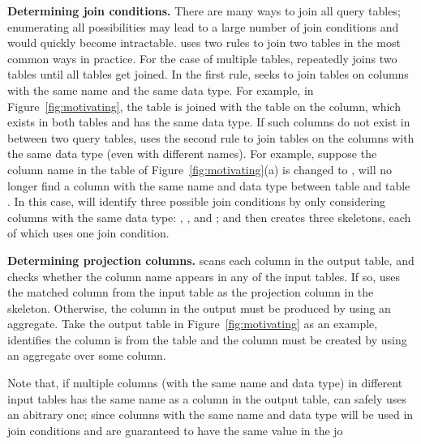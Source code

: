 \vspace{1mm}
{\textbf{Determining join conditions. }} There
are many ways to join all query tables; enumerating
all possibilities may lead to a large number of
join conditions and would quickly
become intractable. \ourtool uses
two rules to join two tables in 
the most common ways in practice. For the case of
multiple tables, \ourtool repeatedly joins
two tables until all tables get joined.
In the first rule, \ourtool seeks to join
tables on columns with the
same name and the same data type. For example,
in Figure~\ref{fig:motivating}, the  table
is joined with the  table on the
 column, which exists in both
tables and has the same data type.
If such columns do not exist in between two
query tables, \ourtool uses the second rule to
join tables on the columns with the same data type
(even with different names).
For example, suppose the column name 
in the  table of Figure~\ref{fig:motivating}(a)
is changed to , \ourtool will no longer
find a column with the same name and data type between
table  and table . In this case,
\ourtool will identify three possible join conditions
by only considering columns with the same data type:
, ,
and ; and then creates 
three skeletons, each of which uses one join condition. 

{\textbf{Determining projection columns.}} \ourtool
scans each column in the output table, and checks whether
the column name appears in any of the input tables.
If so, \ourtool uses the matched column from the input
table as the projection column in the skeleton.
Otherwise, the column in the output must be produced by using an aggregate.
Take the output table in Figure~\ref{fig:motivating} as an
example, \ourtool identifies the  column
is from the  table and
the  column must be created by using
an aggregate over some column.


Note that, if multiple columns (with the same name and data type)
in different input tables has the same name as a column in the output table, \ourtool
can safely uses an abitrary one; since columns with the
same name and data type will be used in join conditions and
are guaranteed to have the same value in the jo



